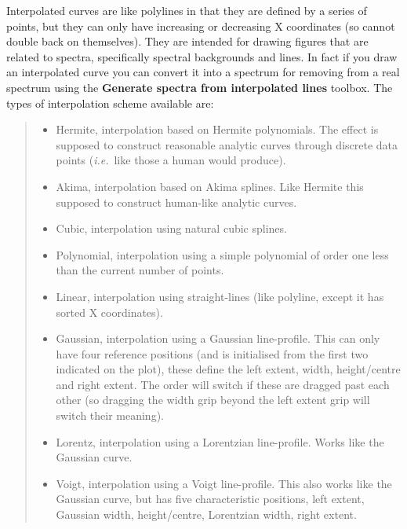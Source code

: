 \documentclass[twoside,11pt,nolof]{starlink}
\newcommand{\labelitem}[1]{\textbf{#1}}
\providecommand{\ie}{\textit{i.e.}}
\begin{document}
Interpolated curves are like polylines in that they are defined by a series of
points, but they can only have increasing or decreasing X coordinates (so
cannot double back on themselves). They are intended for drawing figures that
are related to spectra, specifically spectral backgrounds and lines. In fact
if you draw an interpolated curve you can convert it into a spectrum for
removing from a real spectrum using the \labelitem{Generate spectra from
interpolated lines} toolbox. The types of interpolation scheme available are:
\begin{quote}
\begin{itemize}

  \item Hermite, interpolation based on Hermite polynomials. The effect is
        supposed to construct reasonable analytic curves through discrete data
        points (\ie\ like those a human would produce).

  \item Akima, interpolation based on Akima splines. Like Hermite this
        supposed to construct human-like analytic curves.

  \item Cubic, interpolation using natural cubic splines.

  \item Polynomial, interpolation using a simple polynomial of order one less
        than the current number of points.

  \item Linear, interpolation using straight-lines (like polyline, except it
        has sorted X coordinates).

  \item Gaussian, interpolation using a Gaussian line-profile. This can only
        have four reference positions (and is initialised from the first two
        indicated on the plot), these define the left extent, width,
        height/centre and right extent. The order will switch if these are
        dragged past each other (so dragging the width grip beyond the left
        extent grip will switch their meaning).

  \item Lorentz, interpolation using a Lorentzian line-profile. Works like the
        Gaussian curve.

  \item Voigt, interpolation using a Voigt line-profile. This also works like
        the Gaussian curve, but has five characteristic positions, left
        extent, Gaussian width, height/centre, Lorentzian width, right extent.

\end{itemize}
\end{quote}
\end{document}
